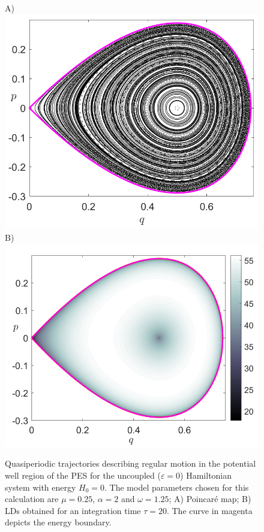\documentclass[8pt]{article}
\begin{document}
\begin{figure}[!ht]
	\begin{center}
		A)\includegraphics[scale=0.32]{fig8a}
		B)\includegraphics[scale=0.33]{fig8b}
	\end{center}
	
	\caption{Quasiperiodic trajectories describing regular motion in the potential well region of the PES for the uncoupled ($\varepsilon = 0$) Hamiltonian system with energy $H_0 = 0$. The model parameters chosen for this calculation are $\mu = 0.25$, $\alpha = 2$ and $\omega = 1.25$; A) Poincar\'e map; B) LDs obtained for an integration time $\tau = 20$. The curve in magenta depicts the energy boundary.}
	\label{fig:LD_PS_uncoupled}
\end{figure}
\end{document}
